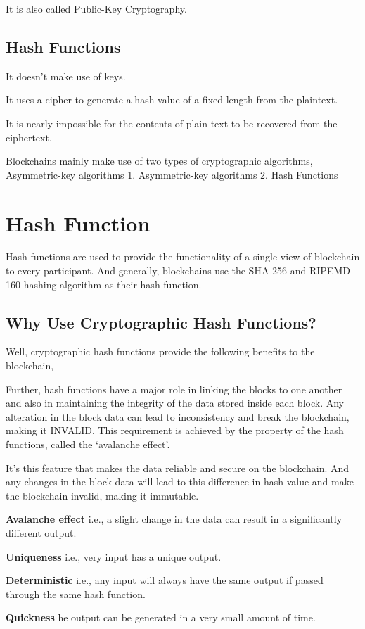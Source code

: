 \documentclass[BTech]{srmuthesis}
\begin{document}
 It is also called Public-Key Cryptography.
 \subsection{ Hash Functions}
 It doesn’t make use of keys.

 It uses a cipher to generate a hash value of a fixed length from the plaintext.

 It is nearly impossible for the contents of plain text to be recovered from the ciphertext.

 Blockchains mainly make use of two types of cryptographic algorithms,
Asymmetric-key algorithms
 1. Asymmetric-key algorithms
 2. Hash Functions

 \section{Hash Function}
 Hash functions are used to provide the functionality of a single view of blockchain to every participant. And generally, blockchains use the SHA-256 and RIPEMD-160 hashing algorithm as their hash function.

 \subsection{Why Use Cryptographic Hash Functions? }
 Well, cryptographic hash functions provide the following benefits to the blockchain,

 Further, hash functions have a major role in linking the blocks to one another and also in maintaining the integrity of the data stored inside each block. Any alteration in the block data can lead to inconsistency and break the blockchain, making it INVALID. This requirement is achieved by the property of the hash functions, called the ‘avalanche effect’.

 It’s this feature that makes the data reliable and secure on the blockchain. And any changes in the block data will lead to this difference in hash value and make the blockchain invalid, making it immutable.

 \textbf{Avalanche effect }i.e., a slight change in the data can result in a significantly different output.

 \textbf{Uniqueness } i.e., very input has a unique output.

 \textbf{Deterministic}  i.e., any input will always have the same output if passed through the same hash function.

 \textbf{Quickness} he output can be generated in a very small amount of time.
\end{document}
